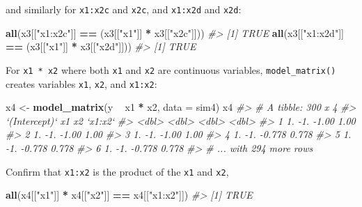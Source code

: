 \documentclass[]{book}
\newenvironment{Shaded}{\begin{snugshade}}{\end{snugshade}}
\newcommand{\CommentTok}[1]{\textcolor[rgb]{0.56,0.35,0.01}{\textit{#1}}}
\newcommand{\DataTypeTok}[1]{\textcolor[rgb]{0.13,0.29,0.53}{#1}}
\newcommand{\KeywordTok}[1]{\textcolor[rgb]{0.13,0.29,0.53}{\textbf{#1}}}
\newcommand{\NormalTok}[1]{#1}
\newcommand{\OperatorTok}[1]{\textcolor[rgb]{0.81,0.36,0.00}{\textbf{#1}}}
\newcommand{\StringTok}[1]{\textcolor[rgb]{0.31,0.60,0.02}{#1}}
\theoremstyle{definition}
\theoremstyle{definition}
\theoremstyle{definition}
\theoremstyle{remark}
\begin{document}
and similarly for \texttt{x1:x2c} and \texttt{x2c}, and \texttt{x1:x2d}
and \texttt{x2d}:

\begin{Shaded}
\begin{Highlighting}[]
\KeywordTok{all}\NormalTok{(x3[[}\StringTok{"x1:x2c"}\NormalTok{]] }\OperatorTok{==}\StringTok{ }\NormalTok{(x3[[}\StringTok{"x1"}\NormalTok{]] }\OperatorTok{*}\StringTok{ }\NormalTok{x3[[}\StringTok{"x2c"}\NormalTok{]]))}
\CommentTok{#> [1] TRUE}
\KeywordTok{all}\NormalTok{(x3[[}\StringTok{"x1:x2d"}\NormalTok{]] }\OperatorTok{==}\StringTok{ }\NormalTok{(x3[[}\StringTok{"x1"}\NormalTok{]] }\OperatorTok{*}\StringTok{ }\NormalTok{x3[[}\StringTok{"x2d"}\NormalTok{]]))}
\CommentTok{#> [1] TRUE}
\end{Highlighting}
\end{Shaded}

For \texttt{x1\ *\ x2} where both \texttt{x1} and \texttt{x2} are
continuous variables, \texttt{model\_matrix()} creates variables
\texttt{x1}, \texttt{x2}, and \texttt{x1:x2}:

\begin{Shaded}
\begin{Highlighting}[]
\NormalTok{x4 <-}\StringTok{ }\KeywordTok{model_matrix}\NormalTok{(y }\OperatorTok{~}\StringTok{ }\NormalTok{x1 }\OperatorTok{*}\StringTok{ }\NormalTok{x2, }\DataTypeTok{data =}\NormalTok{ sim4)}
\NormalTok{x4}
\CommentTok{#> # A tibble: 300 x 4}
\CommentTok{#>   `(Intercept)`    x1     x2 `x1:x2`}
\CommentTok{#>           <dbl> <dbl>  <dbl>   <dbl>}
\CommentTok{#> 1            1.   -1. -1.00    1.00 }
\CommentTok{#> 2            1.   -1. -1.00    1.00 }
\CommentTok{#> 3            1.   -1. -1.00    1.00 }
\CommentTok{#> 4            1.   -1. -0.778   0.778}
\CommentTok{#> 5            1.   -1. -0.778   0.778}
\CommentTok{#> 6            1.   -1. -0.778   0.778}
\CommentTok{#> # ... with 294 more rows}
\end{Highlighting}
\end{Shaded}

Confirm that \texttt{x1:x2} is the product of the \texttt{x1} and
\texttt{x2},

\begin{Shaded}
\begin{Highlighting}[]
\KeywordTok{all}\NormalTok{(x4[[}\StringTok{"x1"}\NormalTok{]] }\OperatorTok{*}\StringTok{ }\NormalTok{x4[[}\StringTok{"x2"}\NormalTok{]] }\OperatorTok{==}\StringTok{ }\NormalTok{x4[[}\StringTok{"x1:x2"}\NormalTok{]])}
\CommentTok{#> [1] TRUE}
\end{Highlighting}
\end{Shaded}
\end{document}

